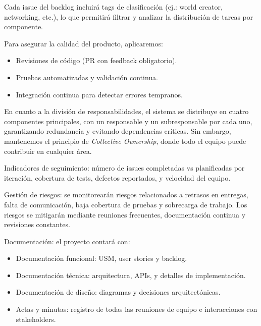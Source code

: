 \vspace{0.25cm}

Cada issue del backlog incluirá tags de clasificación (ej.: world creator, networking, etc.), lo que permitirá filtrar 
y analizar la distribución de tareas por componente.

\vspace{0.25cm}

Para asegurar la calidad del producto, aplicaremos:

\begin{itemize}
    \item Revisiones de código (PR con feedback obligatorio).
    \item Pruebas automatizadas y validación continua.
    \item Integración continua para detectar errores tempranos.
\end{itemize}

\vspace{0.25cm}

En cuanto a la división de responsabilidades, el sistema se distribuye en cuatro componentes principales, con un 
responsable y un subresponsable por cada uno, garantizando redundancia y evitando dependencias críticas. Sin embargo, 
mantenemos el principio de \textit{Collective Ownership}, donde todo el equipo puede contribuir en cualquier área.

\vspace{0.25cm}

Indicadores de seguimiento: número de issues completadas vs planificadas por iteración, cobertura de tests, defectos 
reportados, y velocidad del equipo.

\vspace{0.25cm}

Gestión de riesgos: se monitorearán riesgos relacionados a retrasos en entregas, falta de comunicación, baja cobertura 
de pruebas y sobrecarga de trabajo. Los riesgos se mitigarán mediante reuniones frecuentes, documentación continua y 
revisiones constantes.

\vspace{0.25cm}

Documentación: el proyecto contará con:

\begin{itemize}
    \item Documentación funcional: USM, user stories y backlog.
    \item Documentación técnica: arquitectura, APIs, y detalles de implementación.
    \item Documentación de diseño: diagramas y decisiones arquitectónicas.
    \item Actas y minutas: registro de todas las reuniones de equipo e interacciones con stakeholders.
\end{itemize}

